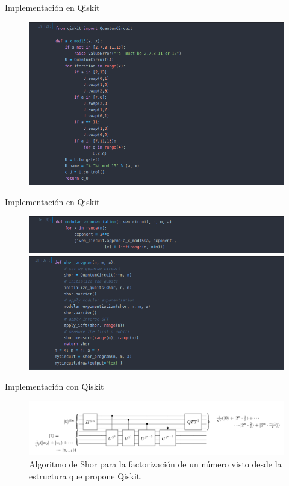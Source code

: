 \begin{frame}{Implementación en Qiskit}
    \begin{figure}[H]
        \centering
        \includegraphics[scale=0.37]{images/alg.png}
    \end{figure}
\end{frame}
\begin{frame}{Implementación en Qiskit}
    \begin{figure}[H]
        \centering
        \includegraphics[scale=0.37]{images/alg2.png}\vspace{-0.05cm}\\
        \includegraphics[scale=0.37]{images/alg3.png}
    \end{figure}
\end{frame}
\begin{frame}{Implementación con Qiskit}
    \begin{figure}[H]
    \centering
    \includegraphics[scale=0.3]{images/shor_circuit.png}
    \caption{Algoritmo de Shor para la factorización de un número visto desde la estructura que propone Qiskit.}
    \label{fig:shorcircuit}
\end{figure}
\end{frame}
